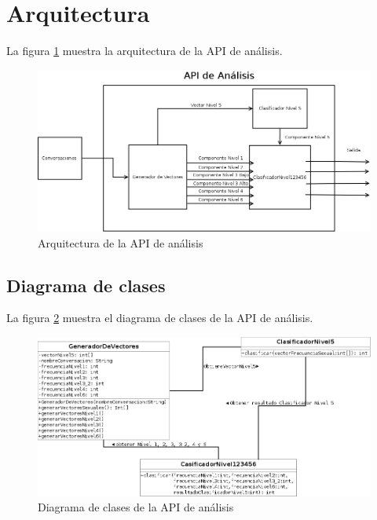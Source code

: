 \section{Arquitectura}

La figura \ref{fig:arquitecturap5} muestra la arquitectura de la API de an\'alisis.

\begin{figure}[h]
\begin{center}
\includegraphics[scale=.3]{images/api}
\caption{Arquitectura de la API de an\'alisis}
\label{fig:arquitecturap5}
\end{center}
\end{figure}


\subsection{Diagrama de clases}


La figura \ref{fig:dclasesp5} muestra el diagrama de clases de la API de an\'alisis.
\begin{figure}[h]
\begin{center}
\includegraphics[scale=.3]{images/api2}
\caption{Diagrama de clases de la API de an\'alisis}
\label{fig:dclasesp5}
\end{center}
\end{figure}

